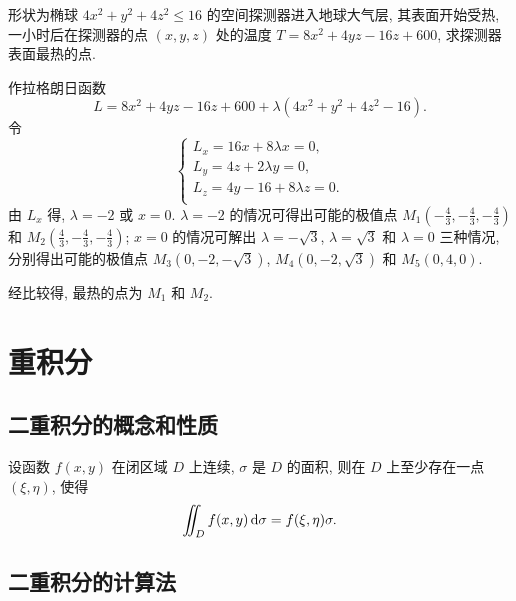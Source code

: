 \documentclass[a4paper,10pt,fleqn]{article}
\begin{document}
\begin{exmp}
    形状为椭球 $4x^2+y^2+4z^2\leq16$ 的空间探测器进入地球大气层, 其表面开始受热, 一小时后在探测器的点 $(x,y,z)$ 处的温度
    $T=8x^2+4yz-16z+600$, 求探测器表面最热的点.

    作拉格朗日函数
    \[
        L=8x^2+4yz-16z+600+\lambda(4x^2+y^2+4z^2-16).
    \]
    令
    \[
        \begin{cases}
            L_x=16x+8\lambda x=0,   \\
            L_y=4z+2\lambda y=0,    \\
            L_z=4y-16+8\lambda z=0. \\
        \end{cases}
    \]
    由 $L_x$ 得, $\lambda=-2$ 或 $x=0$. $\lambda=-2$ 的情况可得出可能的极值点
    $M_1(-\frac{4}{3},-\frac{4}{3},-\frac{4}{3})$ 和 $M_2(\frac{4}{3},-\frac{4}{3},-\frac{4}{3})$;
    $x=0$ 的情况可解出 $\lambda=-\sqrt{3}$, $\lambda=\sqrt{3}$ 和 $\lambda=0$ 三种情况, 分别得出可能的极值点
    $M_3(0,-2,-\sqrt{3})$, $M_4(0,-2,\sqrt{3})$ 和 $M_5(0,4,0)$.

    经比较得, 最热的点为 $M_1$ 和 $M_2$.
\end{exmp}

\section{重积分}

\subsection{二重积分的概念和性质}

\begin{thm}[二重积分的中值定理]
    设函数 $f(x,y)$ 在闭区域 $D$ 上连续, $\sigma$ 是 $D$ 的面积, 则在 $D$ 上至少存在一点 $(\xi,\eta)$, 使得
    \[
        \iint_Df(x,y)\,{\rm d}\sigma=f(\xi,\eta)\sigma.
    \]
\end{thm}

\subsection{二重积分的计算法}
\end{document}
